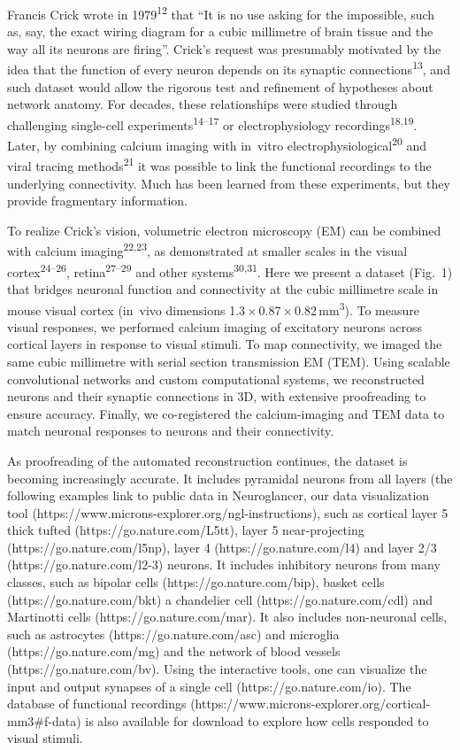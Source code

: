 \documentclass{article}
\begin{document}
Francis Crick wrote in 1979\textsuperscript{12} that “It is no use asking for the impossible, such as, say, the exact wiring diagram for a cubic millimetre of brain tissue and the way all its neurons are firing”. Crick’s request was presumably motivated by the idea that the function of every neuron depends on its synaptic connections\textsuperscript{13}, and such dataset would allow the rigorous test and refinement of hypotheses about network anatomy. For decades, these relationships were studied through challenging single-cell experiments\textsuperscript{14–17} or electrophysiology recordings\textsuperscript{18,19}. Later, by combining calcium imaging with in~vitro electrophysiological\textsuperscript{20} and viral tracing methods\textsuperscript{21} it was possible to link the functional recordings to the underlying connectivity. Much has been learned from these experiments, but they provide fragmentary information.

To realize Crick’s vision, volumetric electron microscopy (EM) can be combined with calcium imaging\textsuperscript{22,23}, as demonstrated at smaller scales in the visual cortex\textsuperscript{24–26}, retina\textsuperscript{27–29} and other systems\textsuperscript{30,31}. Here we present a dataset (Fig.~1) that bridges neuronal function and connectivity at the cubic millimetre scale in mouse visual cortex (in~vivo dimensions 1.3\,×\,0.87\,×\,0.82\,mm\textsuperscript{3}). To measure visual responses, we performed calcium imaging of excitatory neurons across cortical layers in response to visual stimuli. To map connectivity, we imaged the same cubic millimetre with serial section transmission EM (TEM). Using scalable convolutional networks and custom computational systems, we reconstructed neurons and their synaptic connections in 3D, with extensive proofreading to ensure accuracy. Finally, we co-registered the calcium-imaging and TEM data to match neuronal responses to neurons and their connectivity.

As proofreading of the automated reconstruction continues, the dataset is becoming increasingly accurate. It includes pyramidal neurons from all layers (the following examples link to public data in Neuroglancer, our data visualization tool (https://www.microns-explorer.org/ngl-instructions), such as cortical layer 5 thick tufted (https://go.nature.com/L5tt), layer 5 near-projecting (https://go.nature.com/l5np), layer 4 (https://go.nature.com/l4) and layer 2/3 (https://go.nature.com/l2-3) neurons. It includes inhibitory neurons from many classes, such as bipolar cells (https://go.nature.com/bip), basket cells (https://go.nature.com/bkt) a chandelier cell (https://go.nature.com/cdl) and Martinotti cells (https://go.nature.com/mar). It also includes non-neuronal cells, such as astrocytes (https://go.nature.com/asc) and microglia (https://go.nature.com/mg) and the network of blood vessels (https://go.nature.com/bv). Using the interactive tools, one can visualize the input and output synapses of a single cell (https://go.nature.com/io). The database of functional recordings (https://www.microns-explorer.org/cortical-mm3\#f-data) is also available for download to explore how cells responded to visual stimuli.
\end{document}
